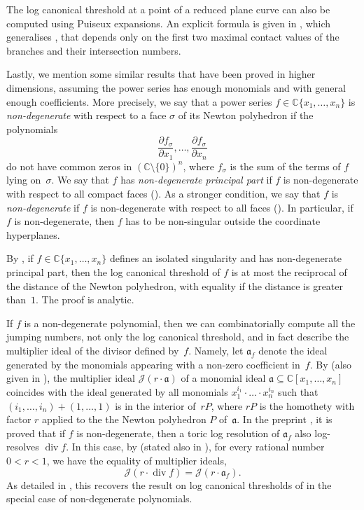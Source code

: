 \documentclass[a4paper, 12pt, oneside]{article}
\theoremstyle{plain}
\theoremstyle{definition}
\theoremstyle{remark}
\numberwithin{theorem}{section}
\numberwithin{table}{section}
\numberwithin{equation}{theorem}
\begin{document}
The log canonical threshold at a point of a reduced plane curve can also be computed using Puiseux expansions. An explicit formula is given in \cite[Theorem~2.13]{GHM16}, which generalises \cite[Theorems 1.2 and~1.3]{Kuw99}, that depends only on the first two maximal contact values of the branches and their intersection numbers.

Lastly, we mention some similar results that have been proved in higher dimensions, assuming the power series has enough monomials and with general enough coefficients. More precisely, we say that a power series $f \in \mathbb C\{x_1, \ldots, x_n\}$ is \emph{non-degenerate} with respect to a face $\sigma$ of its Newton polyhedron if the polynomials
\[
\frac{\partial f_\sigma}{\partial x_1}, \ldots, \frac{\partial f_\sigma}{\partial x_n}
\]
do not have common zeros in $(\mathbb C \setminus \{0\})^n$, where $f_\sigma$ is the sum of the terms of $f$ lying on~$\sigma$. We say that $f$ has \emph{non-degenerate principal part} if $f$ is non-degenerate with respect to all compact faces (\cite[Definition~6.2.2]{AGZV12b}). As a stronger condition, we say that $f$ is \emph{non-degenerate} if $f$ is non-degenerate with respect to all faces (\cite[Definition~5]{How03}). In particular, if $f$ is non-degenerate, then $f$ has to be non-singular outside the coordinate hyperplanes.

By \cite[Theorem~13.2(1)]{AGZV12b}, if $f \in \mathbb C\{x_1, \ldots, x_n\}$ defines an isolated singularity and has non-degenerate principal part, then the log canonical threshold of $f$ is at most the reciprocal of the distance of the Newton polyhedron, with equality if the distance is greater than~$1$. The proof is analytic.

If $f$ is a non-degenerate polynomial, then we can combinatorially compute all the jumping numbers, not only the log canonical threshold, and in fact describe the multiplier ideal of the divisor defined by~$f$. Namely, let $\mathfrak a_f$ denote the ideal generated by the monomials appearing with a non-zero coefficient in~$f$.
By \cite[Main Theorem]{How01} (also given in \cite[Theorem~9.3.27]{Laz04b}), the multiplier ideal $\mathcal J(r \cdot \mathfrak a)$ of a monomial ideal $\mathfrak a \subseteq \mathbb C[x_1, \ldots, x_n]$ coincides with the ideal generated by all monomials $x_1^{i_1} \cdot \ldots \cdot x_n^{i_n}$ such that $(i_1, \ldots, i_n) + (1, \ldots, 1)$ is in the interior of~$rP$, where $rP$ is the homothety with factor $r$ applied to the the Newton polyhedron $P$ of~$\mathfrak a$.
In the preprint \cite[Theorem~12]{How03}, it is proved that if $f$ is non-degenerate, then a toric log resolution of $\mathfrak a_f$ also log-resolves $\operatorname{div} f$. In this case, by \cite[Corollary~13]{How03} (stated also in \cite[Theorem~9.3.37]{Laz04b}), for every rational number~$0 < r < 1$, we have the equality of multiplier ideals,
\[
\mathcal J(r \cdot \operatorname{div} f) = \mathcal J(r \cdot \mathfrak a_f).
\]
As detailed in \cite[Example~9.3.31]{Laz04b}, this recovers the result on log canonical thresholds of \cite[Theorem~13.2(1)]{AGZV12b} in the special case of non-degenerate polynomials.
\end{document}
